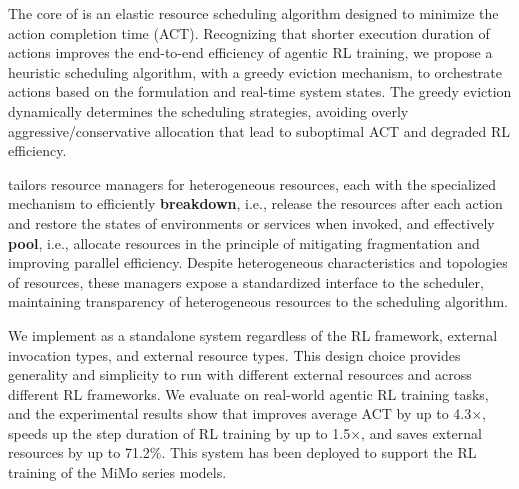 The core of \sysname is an elastic resource scheduling algorithm designed to minimize the action completion time (ACT).
Recognizing that shorter execution duration of actions improves the end-to-end efficiency of agentic RL training, 
we propose a heuristic scheduling algorithm, with a greedy eviction mechanism, to orchestrate actions based on the formulation and real-time system states. %
The greedy eviction dynamically determines the scheduling strategies, avoiding overly aggressive/conservative allocation that lead to suboptimal ACT and degraded RL efficiency. %

\sysname tailors resource managers for heterogeneous resources, each with the specialized mechanism to efficiently \textbf{breakdown}, i.e., release the resources after each action and restore the states of environments or services when invoked, and effectively \textbf{pool}, i.e., allocate resources in the principle of mitigating fragmentation and improving parallel efficiency. 
Despite heterogeneous characteristics and topologies of resources, these managers expose a standardized interface to the scheduler, maintaining transparency of heterogeneous resources to the scheduling algorithm.

We implement \sysname as a standalone system regardless of the RL framework, external invocation types, and external resource types.
This design choice provides generality and simplicity to run with different external resources and across different RL frameworks.
We evaluate \sysname on real-world agentic RL training tasks, and the experimental results show that \sysname improves average ACT by up to 4.3$\times$, speeds up the step duration of RL training by up to 1.5$\times$, and saves external resources by up to 71.2$\%$. This system has been deployed to support the RL training of the MiMo series models.

